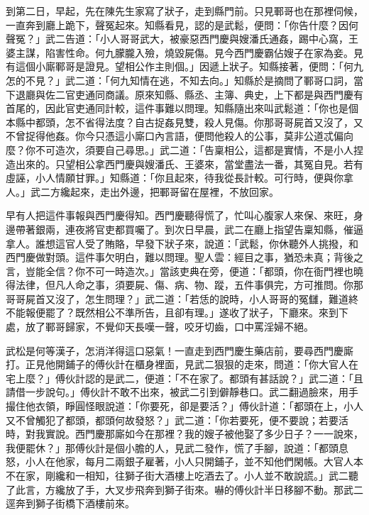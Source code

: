 到第二日，早起，先在陳先生家寫了狀子，走到縣門前。只見鄆哥也在那裡伺候，一直奔到廳上跪下，聲冤起來。知縣看見，認的是武鬆，便問：「你告什麼？因何聲冤？」武二告道：「小人哥哥武大，被豪惡西門慶與嫂潘氏通姦，踢中心窩，王婆主謀，陷害性命。何九朦朧入殮，燒毀屍傷。見今西門慶霸佔嫂子在家為妾。見有這個小廝鄆哥是證見。望相公作主則個。」因遞上狀子。知縣接著，便問：「何九怎的不見？」武二道：「何九知情在逃，不知去向。」知縣於是摘問了鄆哥口詞，當下退廳與佐二官吏通同商議。原來知縣、縣丞、主簿、典史，上下都是與西門慶有首尾的，因此官吏通同計較，這件事難以問理。知縣隨出來叫武鬆道：「你也是個本縣中都頭，怎不省得法度？自古捉姦見雙，殺人見傷。你那哥哥屍首又沒了，又不曾捉得他姦。你今只憑這小廝口內言語，便問他殺人的公事，莫非公道忒偏向麼？你不可造次，須要自己尋思。」武二道：「告稟相公，這都是實情，不是小人捏造出來的。只望相公拿西門慶與嫂潘氏、王婆來，當堂盡法一番，其冤自見。若有虛誣，小人情願甘罪。」知縣道：「你且起來，待我從長計較。可行時，便與你拿人。」武二方纔起來，走出外邊，把鄆哥留在屋裡，不放回家。

早有人把這件事報與西門慶得知。西門慶聽得慌了，忙叫心腹家人來保、來旺，身邊帶著銀兩，連夜將官吏都買囑了。到次日早晨，武二在廳上指望告稟知縣，催逼拿人。誰想這官人受了賄賂，早發下狀子來，說道：「武鬆，你休聽外人挑撥，和西門慶做對頭。這件事欠明白，難以問理。聖人雲：經目之事，猶恐未真；背後之言，豈能全信？你不可一時造次。」當該吏典在旁，便道：「都頭，你在衙門裡也曉得法律，但凡人命之事，須要屍、傷、病、物、蹤，五件事俱完，方可推問。你那哥哥屍首又沒了，怎生問理？」武二道：「若恁的說時，小人哥哥的冤讎，難道終不能報便罷了？既然相公不準所告，且卻有理。」遂收了狀子，下廳來。來到下處，放了鄆哥歸家，不覺仰天長嘆一聲，咬牙切齒，口中罵淫婦不絕。

武松是何等漢子，怎消洋得這口惡氣！一直走到西門慶生藥店前，要尋西門慶廝打。正見他開鋪子的傅伙計在櫃身裡面，見武二狠狠的走來，問道：「你大官人在宅上麼？」傅伙計認的是武二，便道：「不在家了。都頭有甚話說？」武二道：「且請借一步說句。」傅伙計不敢不出來，被武二引到僻靜巷口。武二翻過臉來，用手撮住他衣領，睜圓怪眼說道：「你要死，卻是要活？」傅伙計道：「都頭在上，小人又不曾觸犯了都頭，都頭何故發怒？」武二道：「你若要死，便不要說；若要活時，對我實說。西門慶那廝如今在那裡？我的嫂子被他娶了多少日子？一一說來，我便罷休？」那傅伙計是個小膽的人，見武二發作，慌了手腳，說道：「都頭息怒，小人在他家，每月二兩銀子雇著，小人只開鋪子，並不知他們閑帳。大官人本不在家，剛纔和一相知，往獅子街大酒樓上吃酒去了。小人並不敢說謊。」武二聽了此言，方纔放了手，大叉步飛奔到獅子街來。嚇的傅伙計半日移腳不動。那武二逕奔到獅子街橋下酒樓前來。

